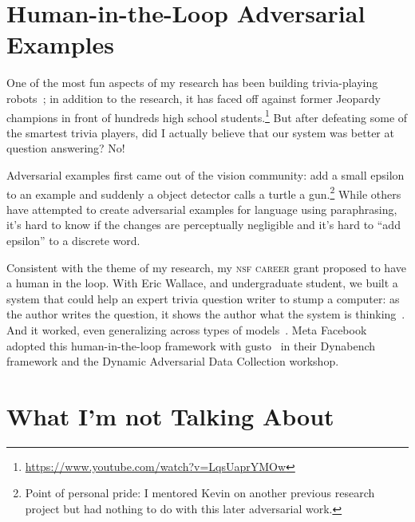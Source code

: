 \documentclass[11pt]{amsart}
\newcommand{\abr}[1]{\textsc{#1}}
\begin{document}
\section{Human-in-the-Loop Adversarial Examples}

One of the most fun aspects of my research has been building
trivia-playing robots~\cite{boyd-graber-12,iyyer-14b,iyyer-15}; in
addition to the research, it has faced off against
former Jeopardy champions in front of hundreds high school
students.\footnote{\url{https://www.youtube.com/watch?v=LqsUaprYMOw}}
%
But after defeating some of the smartest trivia players, did I
actually believe that our system was better at question answering?
%
No!

Adversarial examples first came out of the vision community: add a
small epsilon to an example and suddenly a object detector calls a
turtle a gun.\footnote{Point of personal pride: I mentored Kevin on
another previous research project but had nothing to do with this later
adversarial work.}
%
While others have attempted to create adversarial examples for
language using paraphrasing, it's hard to know if the changes are
perceptually negligible and it's hard to ``add epsilon'' to a discrete
word.

Consistent with the theme of my research, my \abr{nsf career} grant
proposed to have a human in the loop.
%
With Eric Wallace, and undergraduate student, we built a system that
could help an expert trivia question writer to stump a computer: as
the author writes the question, it shows the author what the system is
thinking~\cite{wallace-18}.
%
And it worked, even generalizing across types of
models~\cite{wallace-19}.
%
Meta Facebook adopted this human-in-the-loop framework with
gusto~\cite{bartolo-20} in their Dynabench framework and the Dynamic
Adversarial Data Collection workshop.

\section{What I'm not Talking About}
\end{document}
